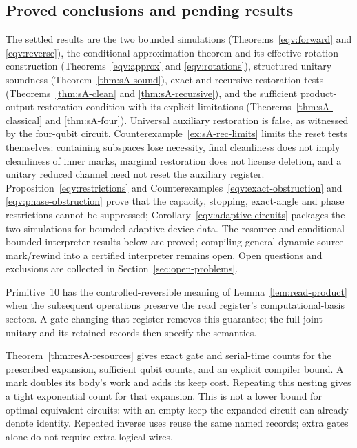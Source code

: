\subsection{Proved conclusions and pending results}
The settled results are the two bounded simulations (Theorems~\ref{eqv:forward} and \ref{eqv:reverse}), the conditional approximation theorem and its effective rotation construction (Theorems~\ref{eqv:approx} and \ref{eqv:rotations}), structured unitary soundness (Theorem~\ref{thm:sA-sound}), exact and recursive restoration tests (Theorems~\ref{thm:sA-clean} and \ref{thm:sA-recursive}), and the sufficient product-output restoration condition with its explicit limitations (Theorems~\ref{thm:sA-classical} and \ref{thm:sA-four}). Universal auxiliary restoration is false, as witnessed by the four-qubit circuit.
Counterexample~\ref{ex:sA-rec-limits} limits the reset tests themselves:
containing subspaces lose necessity, final cleanliness does not imply
cleanliness of inner marks, marginal restoration does not license
deletion, and a unitary reduced channel need not reset the auxiliary
register. Proposition~\ref{eqv:restrictions} and
Counterexamples~\ref{eqv:exact-obstruction} and
\ref{eqv:phase-obstruction} prove that the capacity, stopping, exact-angle
and phase restrictions cannot be suppressed;
Corollary~\ref{eqv:adaptive-circuits} packages the two simulations for
bounded adaptive device data. The resource and conditional bounded-interpreter results below are proved; compiling general dynamic source mark/rewind into a certified interpreter remains open. Open questions and exclusions are collected in Section~\ref{sec:open-problems}.

Primitive~10 has the controlled-reversible meaning of
Lemma~\ref{lem:read-product} when the subsequent operations preserve the
read register's computational-basis sectors. A gate changing that register
removes this guarantee; the full joint unitary and its retained records
then specify the semantics.

Theorem~\ref{thm:resA-resources} gives exact gate and serial-time counts for the prescribed expansion, sufficient qubit counts, and an explicit compiler bound. A mark doubles its body's work and adds its keep cost. Repeating this nesting gives a tight exponential count for that expansion. This is not a lower bound for optimal equivalent circuits: with an empty keep the expanded circuit can already denote identity. Repeated inverse uses reuse the same named records; extra gates alone do not require extra logical wires.

